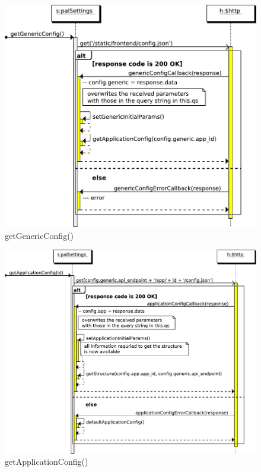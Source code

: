 \begin{figure}[htb]
    \centering
    \includegraphics{figures/design/seqdia/palSettings-getGenericConfig.pdf}
    \caption{getGenericConfig()}
    \label{fig:design-seqdia-palSettings-getGenericConfig}
\end{figure}

\begin{figure}[htb]
    \centering
    \includegraphics{figures/design/seqdia/palSettings-getApplicationConfig.pdf}
    \caption{getApplicationConfig()}
    \label{fig:design-seqdia-palSettings-getApplicationConfig}
\end{figure}


